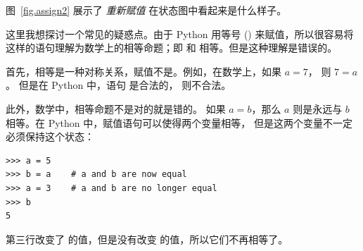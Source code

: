 
图~\ref{fig.assign2} 展示了 {\em 重新赋值} 在状态图中看起来是什么样子。
 


这里我想探讨一个常见的疑惑点。由于 Python 用等号 (\li{=}) 来赋值，所以很容易将  这样的语句理解为数学上的相等命题；即  和  相等。但是这种理解是错误的。


首先，相等是一种对称关系，赋值不是。例如，在数学上，如果 $a = 7$，
则 $7 = a$。 但是在 Python 中，语句  是合法的，  则不合法。


此外，数学中，相等命题不是对的就是错的。 如果 $a = b$，那么 $a$
则是永远与 $b$ 相等。在 Python 中，赋值语句可以使得两个变量相等，
但是这两个变量不一定必须保持这个状态：


\begin{lstlisting}
>>> a = 5
>>> b = a    # a and b are now equal
>>> a = 3    # a and b are no longer equal
>>> b
5
\end{lstlisting}

%

第三行改变了  的值，但是没有改变  的值，所以它们不再相等了。


